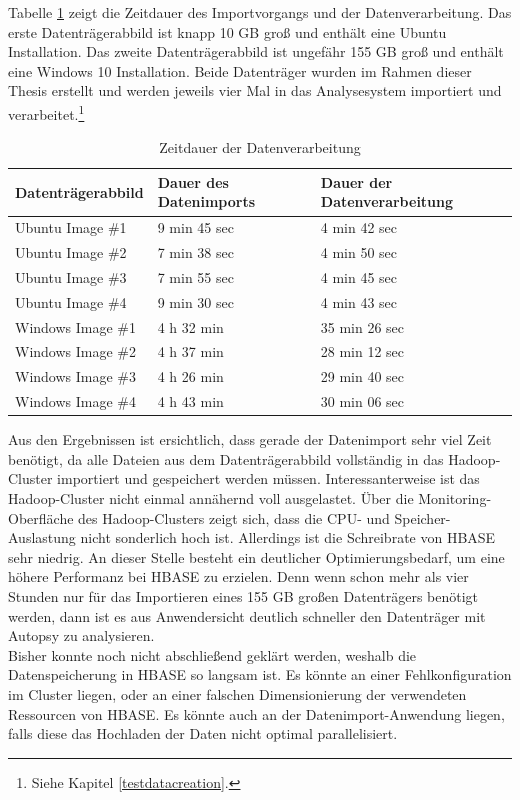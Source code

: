 \noindent
Tabelle \ref{tab:performance_results} zeigt die Zeitdauer des Importvorgangs und der Datenverarbeitung. Das erste Datenträgerabbild ist knapp 10 GB groß und enthält eine Ubuntu Installation. Das zweite Datenträgerabbild ist ungefähr 155 GB groß und enthält eine Windows 10 Installation. Beide Datenträger wurden im Rahmen dieser Thesis erstellt und werden jeweils vier Mal in das Analysesystem importiert und verarbeitet.\footnote{Siehe Kapitel \ref{testdatacreation}.} \\


\begin{table}[ht]
\centering
\begin{tabular}{l|l|l}
Datenträgerabbild & Dauer des Datenimports & Dauer der Datenverarbeitung	\\ \hline
Ubuntu Image \#1 		& 9 min 45 sec	& 4 min 42 sec  \\
Ubuntu Image \#2 		& 7 min 38 sec	& 4 min 50 sec  \\
Ubuntu Image \#3 		& 7 min 55 sec	& 4 min 45 sec  \\
Ubuntu Image \#4 		& 9 min 30 sec	& 4 min 43 sec	\\ \hline
Windows Image \#1 		& 4 h 32 min		& 35 min 26 sec	\\
Windows Image \#2 		& 4 h 37 min		& 28 min 12 sec	\\
Windows Image \#3 		& 4 h 26 min		& 29 min 40 sec	\\
Windows Image \#4 		& 4 h 43 min		& 30 min 06 sec	\\
\end{tabular}
\caption{Zeitdauer der Datenverarbeitung}
\label{tab:performance_results}
\end{table}

\noindent
Aus den Ergebnissen ist ersichtlich, dass gerade der Datenimport sehr viel Zeit benötigt, da alle Dateien aus dem Datenträgerabbild vollständig in das Hadoop-Cluster importiert und gespeichert werden müssen. Interessanterweise ist das Hadoop-Cluster nicht einmal annähernd voll ausgelastet. Über die Monitoring-Oberfläche des Hadoop-Clusters zeigt sich, dass die CPU- und Speicher-Auslastung nicht sonderlich hoch ist. Allerdings ist die Schreibrate von HBASE sehr niedrig. An dieser Stelle besteht ein deutlicher Optimierungsbedarf, um eine höhere Performanz bei HBASE zu erzielen. Denn wenn schon mehr als vier Stunden nur für das Importieren eines 155 GB großen Datenträgers benötigt werden, dann ist es aus Anwendersicht deutlich schneller den Datenträger mit Autopsy zu analysieren.\\
Bisher konnte noch nicht abschließend geklärt werden, weshalb die Datenspeicherung in HBASE so langsam ist. Es könnte an einer Fehlkonfiguration im Cluster liegen, oder an einer falschen Dimensionierung der verwendeten Ressourcen von HBASE. Es könnte auch an der Datenimport-Anwendung liegen, falls diese das Hochladen der Daten nicht optimal parallelisiert.\\

